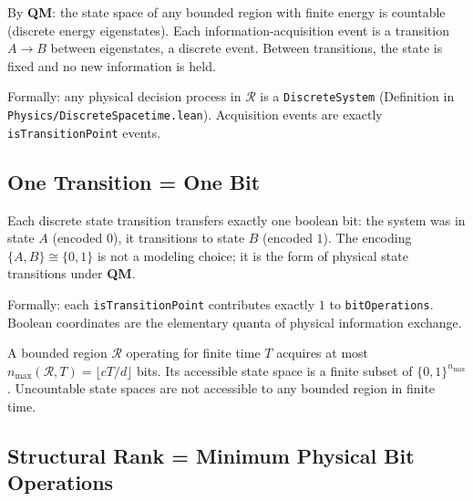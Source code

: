 \begin{theorem}\label{thm:discrete-acquisition}
By \textbf{QM}: the state space of any bounded region with finite energy is
countable (discrete energy eigenstates). Each information-acquisition event is
a transition $A \to B$ between eigenstates, a discrete event. Between
transitions, the state is fixed and no new information is held.

Formally: any physical decision process in $\mathcal{R}$ is a
\texttt{DiscreteSystem} (Definition in \texttt{Physics/DiscreteSpacetime.lean}).
Acquisition events are exactly \texttt{isTransitionPoint} events.
\end{theorem}

\subsection{One Transition = One Bit}\label{sec:one-bit}

\begin{theorem}\label{thm:boolean-primitive}
Each discrete state transition transfers exactly one boolean bit:
the system was in state $A$ (encoded $0$), it transitions to state $B$ (encoded $1$).
The encoding $\{A, B\} \cong \{0, 1\}$ is not a modeling choice; it is the
form of physical state transitions under \textbf{QM}.

Formally: each \texttt{isTransitionPoint} contributes exactly $1$ to
\texttt{bitOperations}. Boolean coordinates are the elementary quanta of
physical information exchange.
\end{theorem}

\begin{corollary}\label{cor:finite-state}
A bounded region $\mathcal{R}$ operating for finite time $T$ acquires at most
$n_{\max}(\mathcal{R}, T) = \lfloor cT/d \rfloor$ bits. Its accessible state
space is a finite subset of $\{0,1\}^{n_{\max}}$.
Uncountable state spaces are not accessible to any bounded region
in finite time.
\end{corollary}

\subsection{Structural Rank = Minimum Physical Bit Operations}\label{sec:srank-physical}

